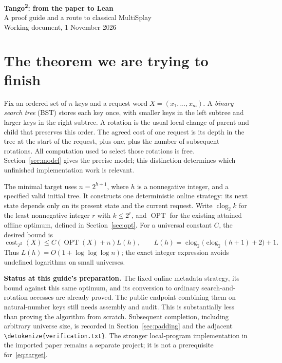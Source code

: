 \documentclass[11pt,a4paper]{article}
\newcommand{\OPT}{\operatorname{OPT}}
\newcommand{\cost}{\operatorname{cost}}
\newcommand{\clog}{\operatorname{clog}_2}
\newcommand{\lean}[1]{{\small\expandafter\nolinkurl\expandafter{\detokenize{#1}}}}
\begin{document}
\begin{center}
{\Large\bfseries Tango\textsuperscript{2}: from the paper to Lean}\\[4pt]
{\large A proof guide and a route to classical MultiSplay}\\[3pt]
Working document, 1 November 2026
\end{center}

\section{The theorem we are trying to finish}\label{sec:scope}
Fix an ordered set of $n$ keys and a request word $X=(x_1,\ldots,x_m)$.
A \emph{binary search tree} (BST) stores each key once, with smaller keys
in the left subtree and larger keys in the right subtree. A rotation is
the usual local change of parent and child that preserves this order.
The agreed cost of one request is its depth in the tree at the start of
the request, plus one, plus the number of subsequent rotations. All
computation used to select those rotations is free. Section~\ref{sec:model}
gives the precise model; this distinction determines which unfinished
implementation work is relevant.

The minimal target uses $n=2^{h+1}$, where $h$ is a nonnegative integer,
and a specified valid initial tree. It constructs one deterministic online
strategy: its next state depends only on its present state and the current
request. Write $\clog k$ for the least nonnegative integer $r$ with
$k\le2^r$, and $\OPT$ for the existing attained offline optimum, defined
in Section~\ref{sec:opt}. For a universal constant $C$, the desired bound is
\begin{equation}\label{eq:target}
 \cost_{T^2}(X)\le C(\OPT(X)+n)L(h),\qquad
 L(h)=\clog\bigl(\clog(h+1)+2\bigr)+1.
\end{equation}
Thus $L(h)=O(1+\log\log\log n)$; the exact integer
expression avoids undefined logarithms on small universes.

\textbf{Status at this guide's preparation.} The fixed online metadata
strategy, its bound against this same optimum, and its conversion to
ordinary search-and-rotation accesses are already proved. The public
endpoint combining them on natural-number keys still needs assembly and
audit. This is substantially less than proving the algorithm from scratch.
Subsequent completion, including arbitrary universe size, is recorded in
Section~\ref{sec:padding} and the adjacent \lean{verification.txt}.
The stronger local-program implementation in the imported paper remains
a separate project; it is not a prerequisite for~\eqref{eq:target}.
\end{document}
